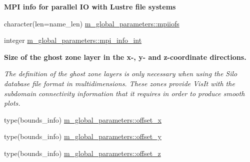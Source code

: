 \begin{Indent}\textbf{ M\+PI info for parallel IO with Lustre file systems}\par
\begin{DoxyCompactItemize}
\item 
character(len=name\+\_\+len) \hyperlink{namespacem__global__parameters_ad4713c1e89eaa8fac3bb2181ba87b192}{m\+\_\+global\+\_\+parameters\+::mpiiofs}
\item 
integer \hyperlink{namespacem__global__parameters_a2663d07998d11d25e223cd7ad0bbd748}{m\+\_\+global\+\_\+parameters\+::mpi\+\_\+info\+\_\+int}
\end{DoxyCompactItemize}
\end{Indent}
\begin{Indent}\textbf{ Size of the ghost zone layer in the x-\/, y-\/ and z-\/coordinate directions.}\par
{\em The definition of the ghost zone layers is only necessary when using the Silo database file format in multidimensions. These zones provide Vis\+It with the subdomain connectivity information that it requires in order to produce smooth plots. }\begin{DoxyCompactItemize}
\item 
type(bounds\+\_\+info) \hyperlink{namespacem__global__parameters_a5f209d71bd815d863485787639d9684a}{m\+\_\+global\+\_\+parameters\+::offset\+\_\+x}
\item 
type(bounds\+\_\+info) \hyperlink{namespacem__global__parameters_a576bd60474fdaccd3ee42edaaabddefa}{m\+\_\+global\+\_\+parameters\+::offset\+\_\+y}
\item 
type(bounds\+\_\+info) \hyperlink{namespacem__global__parameters_aacf46ffa4ec2f27743a20fb3016f2c82}{m\+\_\+global\+\_\+parameters\+::offset\+\_\+z}
\end{DoxyCompactItemize}
\end{Indent}

